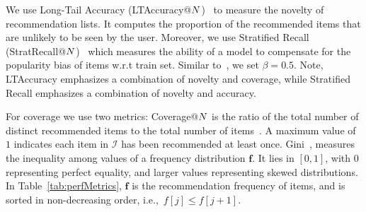 We use Long-Tail Accuracy (LTAccuracy@$N$)~\cite{ho2014likes} to measure the novelty of recommendation lists. It computes the proportion of the recommended items that are unlikely to be seen by the user.  Moreover, we use Stratified Recall (StratRecall@$N$)~\cite{steck2013evaluation} which measures the ability of a model to compensate for the popularity bias of items w.r.t train set. Similar to~\cite{steck2013evaluation}, we set $\beta=0.5$. Note, LTAccuracy emphasizes a combination of novelty and coverage, while Stratified Recall emphasizes a combination of novelty and accuracy. 


For  coverage we use two metrics:  Coverage@$N$  is the ratio of the total number of distinct  recommended  items to the total number of items~\cite{ho2014likes,vargas2014improving}. A maximum value of $1$ indicates  each item in $\mathcal{I}$ has been recommended at least once. 
Gini~\cite{lorenz1905methods},  measures the inequality among values of a frequency distribution $\mathbf{f}$. It lies in $[0,1]$, with $0$ representing perfect equality, and larger  values representing  skewed distributions.  In Table~\ref{tab:perfMetrics},  $\mathbf{f}$ is the recommendation frequency of items,  and is sorted in non-decreasing order, i.e.,~$f[j] \leq f[j+1]$.%

\iffalse
To summarize performance of different algorithms w.r.t. multiple performance metrics,  we compute their weighted harmonic mean,  and rank the algorithms. Since different performance metrics can have different data ranges, we normalize  each metric to the range $[0,1]$.  In table~\ref{tab:perfMetrics},  $\mathbf{x}$ denotes the vector of performance measurements (e.g.$x_1$=precision, $x_2$=recall), and $\mathbf{w}$ their corresponding weights. Note, the harmonic mean of precision and recall is commonly known as F-measure. 
\fi